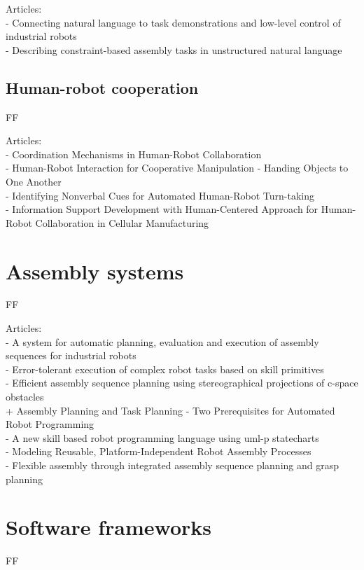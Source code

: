 Articles:\\
- Connecting natural language to task demonstrations and low-level control of industrial robots\\
- Describing constraint-based assembly tasks in unstructured natural language


\subsection{Human-robot cooperation}

FF

Articles:\\
- Coordination Mechanisms in Human-Robot Collaboration\\
- Human-Robot Interaction for Cooperative Manipulation - Handing Objects to One Another\\
- Identifying Nonverbal Cues for Automated Human-Robot Turn-taking\\
- Information Support Development with Human-Centered Approach for Human-Robot Collaboration in Cellular Manufacturing

\section{Assembly systems}

FF

Articles:\\
- A system for automatic planning, evaluation and execution of assembly sequences for industrial robots\\
- Error-tolerant execution of complex robot tasks based on skill primitives\\
- Efficient assembly sequence planning using stereographical projections of c-space obstacles\\
+ Assembly Planning and Task Planning - Two Prerequisites for Automated Robot Programming\\
- A new skill based robot programming language using uml-p statecharts\\
- Modeling Reusable, Platform-Independent Robot Assembly Processes\\
- Flexible assembly through integrated assembly sequence planning and grasp planning

\section{Software frameworks}

FF


